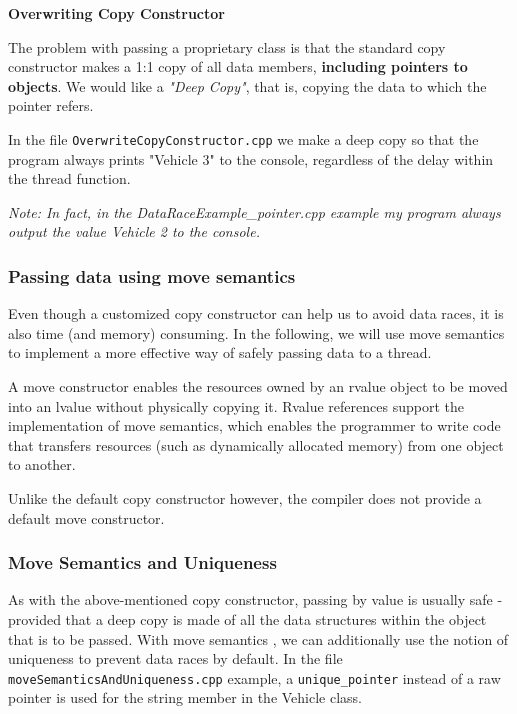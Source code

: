 \documentclass[11pt, a4paper]{article}
\begin{document}
\textbf{Overwriting Copy Constructor}

The problem with passing a proprietary class is that the standard copy constructor makes a 1:1 copy of all data members, \textbf{including pointers to objects}. We would like a \textit{"Deep Copy"}, that is, copying the data to which the pointer refers. 


In the file \texttt{OverwriteCopyConstructor.cpp} we make a deep copy so that the program always prints "Vehicle 3" to the console, regardless of the delay within the thread function.

\textit{Note: In fact, in the DataRaceExample\_pointer.cpp example my program always output the value Vehicle 2 to the console.}



\subsubsection{Passing data using move semantics}%
\label{ssub:passing_data_using_move_semantics}

Even though a customized copy constructor can help us to avoid data races, it is also time (and memory) consuming. In the following, we will use move semantics to implement a more effective way of safely passing data to a thread.

A move constructor enables the resources owned by an rvalue object to be moved into an lvalue without physically copying it. Rvalue references support the implementation of move semantics, which enables the programmer to write code that transfers resources (such as dynamically allocated memory) from one object to another.

Unlike the default copy constructor however, the compiler does not provide a default move constructor. 


\subsubsection{Move Semantics and Uniqueness}%
\label{ssub:move_semantics_and_uniqueness}

As with the above-mentioned copy constructor, passing by value is usually safe - provided that a deep copy is made of all the data structures within the object that is to be passed. With move semantics , we can additionally use the notion of uniqueness to prevent data races by default. In the file \texttt{moveSemanticsAndUniqueness.cpp}  example, a \texttt{unique\_pointer} instead of a raw pointer is used for the string member in the Vehicle class.
\end{document}
